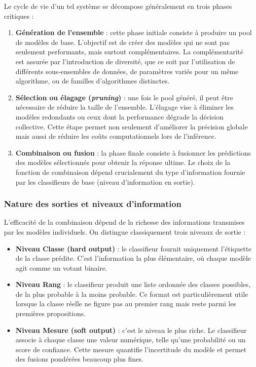 Le cycle de vie d'un tel système se décompose généralement en trois phases critiques :

\begin{enumerate}
  \item \textbf{Génération de l'ensemble} : cette phase initiale consiste à produire un pool de modèles
  de base. L'objectif est de créer des modèles qui ne sont pas seulement performants,
  mais surtout complémentaires. La complémentarité est assurée par l'introduction de
  diversité, que ce soit par l'utilisation de différents sous-ensembles de données, de
  paramètres variés pour un même algorithme, ou de familles d'algorithmes distinctes.

  \item \textbf{Sélection ou élagage (\emph{pruning})} : une fois le pool généré, il peut être nécessaire de
  réduire la taille de l'ensemble. L'élagage vise à éliminer les modèles redondants ou ceux
  dont la performance dégrade la décision collective. Cette étape permet non seulement
  d'améliorer la précision globale mais aussi de réduire les coûts computationnels lors de
  l'inférence.

  \item \textbf{Combinaison ou fusion} : la phase finale consiste à fusionner les prédictions des
  modèles sélectionnés pour obtenir la réponse ultime. Le choix de la fonction de
  combinaison dépend crucialement du type d'information fournie par les classifieurs de
  base (niveau d'information en sortie).
\end{enumerate}

\subsubsection{Nature des sorties et niveaux d'information}

L'efficacité de la combinaison dépend de la richesse des informations transmises par les
modèles individuels. On distingue classiquement trois niveaux de sortie :

\begin{itemize}
  \item \textbf{Niveau \og Classe \fg{} (hard output)} : le classifieur fournit uniquement l'étiquette de la
  classe prédite. C'est l'information la plus élémentaire, où chaque modèle agit comme un
  votant binaire.

  \item \textbf{Niveau \og Rang \fg{}} : le classifieur produit une liste ordonnée des classes possibles, de la
  plus probable à la moins probable. Ce format est particulièrement utile lorsque la classe
  réelle ne figure pas au premier rang mais reste parmi les premières propositions.

  \item \textbf{Niveau \og Mesure \fg{} (soft output)} : c'est le niveau le plus riche. Le classifieur associe à
  chaque classe une valeur numérique, telle qu'une probabilité ou un score de confiance.
  Cette mesure quantifie l'incertitude du modèle et permet des fusions pondérées beaucoup
  plus fines.
\end{itemize}

